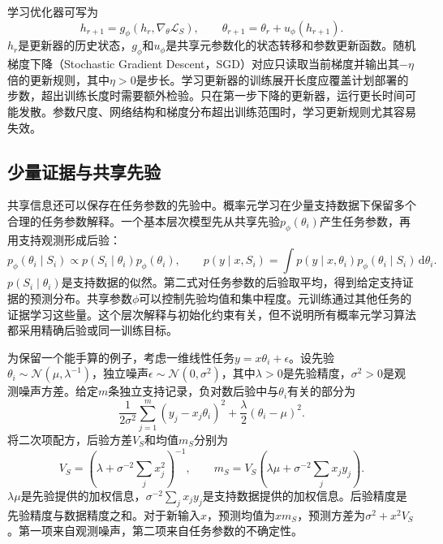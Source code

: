 学习优化器可写为
\begin{equation}
h_{r+1}=g_\phi(h_r,\nabla_\theta\mathcal L_S),\qquad
\theta_{r+1}=\theta_r+u_\phi(h_{r+1}).
\end{equation}
$h_r$是更新器的历史状态，$g_\phi$和$u_\phi$是共享元参数化的状态转移和参数更新函数。随机梯度下降（Stochastic Gradient Descent，SGD）对应只读取当前梯度并输出其$-\eta$倍的更新规则，其中$\eta>0$是步长。学习更新器的训练展开长度应覆盖计划部署的步数，超出训练长度时需要额外检验。只在第一步下降的更新器，运行更长时间可能发散。参数尺度、网络结构和梯度分布超出训练范围时，学习更新规则尤其容易失效。

\subsection{少量证据与共享先验}

共享信息还可以保存在任务参数的先验中。概率元学习在少量支持数据下保留多个合理的任务参数解释\cite{finn2018platipus}。一个基本层次模型先从共享先验$p_\phi(\theta_i)$产生任务参数，再用支持观测形成后验：
\begin{equation}
p_\phi(\theta_i\mid S_i)\propto p(S_i\mid\theta_i)p_\phi(\theta_i),\qquad
p(y\mid x,S_i)=\int p(y\mid x,\theta_i)p_\phi(\theta_i\mid S_i)\,\mathrm d\theta_i.
\end{equation}
$p(S_i\mid\theta_i)$是支持数据的似然。第二式对任务参数的后验取平均，得到给定支持证据的预测分布。共享参数$\phi$可以控制先验均值和集中程度。元训练通过其他任务的证据学习这些量。这个层次解释与初始化约束有关，但不说明所有概率元学习算法都采用精确后验或同一训练目标。

为保留一个能手算的例子，考虑一维线性任务$y=x\theta_i+\epsilon$。设先验$\theta_i\sim\mathcal N(\mu,\lambda^{-1})$，独立噪声$\epsilon\sim\mathcal N(0,\sigma^2)$，其中$\lambda>0$是先验精度，$\sigma^2>0$是观测噪声方差。给定$m$条独立支持记录，负对数后验中与$\theta_i$有关的部分为
\begin{equation}
\frac{1}{2\sigma^2}\sum_{j=1}^m(y_j-x_j\theta_i)^2+\frac\lambda2(\theta_i-\mu)^2.
\end{equation}
将二次项配方，后验方差$V_S$和均值$m_S$分别为
\begin{equation}
 V_S=\left(\lambda+\sigma^{-2}\sum_jx_j^2\right)^{-1},\qquad
 m_S=V_S\left(\lambda\mu+\sigma^{-2}\sum_jx_jy_j\right).
\end{equation}
$\lambda\mu$是先验提供的加权信息，$\sigma^{-2}\sum_jx_jy_j$是支持数据提供的加权信息。后验精度是先验精度与数据精度之和。对于新输入$x$，预测均值为$xm_S$，预测方差为$\sigma^2+x^2V_S$。第一项来自观测噪声，第二项来自任务参数的不确定性。

